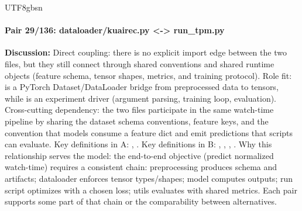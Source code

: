 \documentclass[11pt]{article}
\begin{document}
\begin{CJK*}{UTF8}{gbsn}
\paragraph{Pair 29/136: dataloader/kuairec.py <-> run\_tpm.py}
\textbf{Discussion:} Direct coupling: there is no explicit import edge between the two files, but they still connect through shared conventions and shared runtime objects (feature schema, tensor shapes, metrics, and training protocol). Role fit: \texttt{} is a PyTorch Dataset/DataLoader bridge from preprocessed data to tensors, while \texttt{} is an experiment driver (argument parsing, training loop, evaluation). Cross-cutting dependency: the two files participate in the same watch-time pipeline by sharing the dataset schema conventions, feature keys, and the convention that models consume a feature dict and emit predictions that scripts can evaluate. Key definitions in A: \texttt{}, \texttt{}. Key definitions in B: \texttt{}, \texttt{}, \texttt{}, \texttt{}. Why this relationship serves the model: the end-to-end objective (predict normalized watch-time) requires a consistent chain: preprocessing produces schema and artifacts; dataloader enforces tensor types/shapes; model computes outputs; run script optimizes with a chosen loss; utils evaluates with shared metrics. Each pair supports some part of that chain or the comparability between alternatives.


\end{CJK*}
\end{document}
